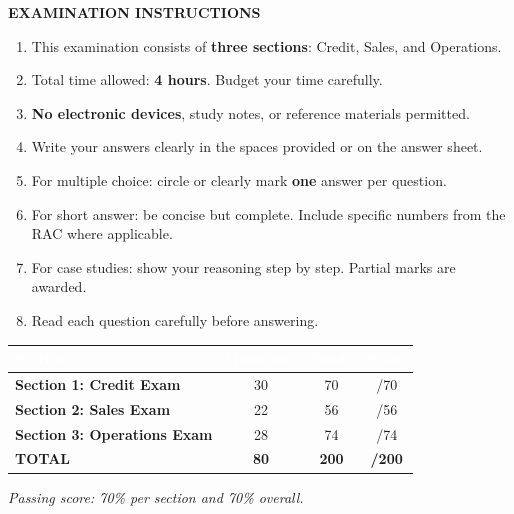 \documentclass[11pt,letterpaper]{article}
\begin{document}
\begin{center}
\begin{tcolorbox}[colback=lightgray, colframe=mhcblue, boxrule=1pt, arc=3pt, width=0.9\textwidth]
\begin{center}
\textbf{EXAMINATION INSTRUCTIONS}
\end{center}
\begin{enumerate}[leftmargin=1.5em, itemsep=0.1em]
\item This examination consists of \textbf{three sections}: Credit, Sales, and Operations.
\item Total time allowed: \textbf{4 hours}. Budget your time carefully.
\item \textbf{No electronic devices}, study notes, or reference materials permitted.
\item Write your answers clearly in the spaces provided or on the answer sheet.
\item For multiple choice: circle or clearly mark \textbf{one} answer per question.
\item For short answer: be concise but complete. Include specific numbers from the RAC where applicable.
\item For case studies: show your reasoning step by step. Partial marks are awarded.
\item Read each question carefully before answering.
\end{enumerate}
\end{tcolorbox}

\vspace{0.7cm}

\begin{tabular}{|l|c|c|c|}
\hline
\rowcolor{mhcblue} \textcolor{white}{\textbf{Section}} & \textcolor{white}{\textbf{Questions}} & \textcolor{white}{\textbf{Points}} & \textcolor{white}{\textbf{Score}} \\
\hline
\textbf{Section 1: Credit Exam} & 30 & 70 & \hspace{1.5cm}/70 \\
\hline
\textbf{Section 2: Sales Exam} & 22 & 56 & \hspace{1.5cm}/56 \\
\hline
\textbf{Section 3: Operations Exam} & 28 & 74 & \hspace{1.5cm}/74 \\
\hline
\rowcolor{lightgray} \textbf{TOTAL} & \textbf{80} & \textbf{200} & \hspace{1.5cm}\textbf{/200} \\
\hline
\end{tabular}

\vspace{0.5cm}

{\small\textit{Passing score: 70\% per section and 70\% overall.}}

\end{center}
\end{document}
